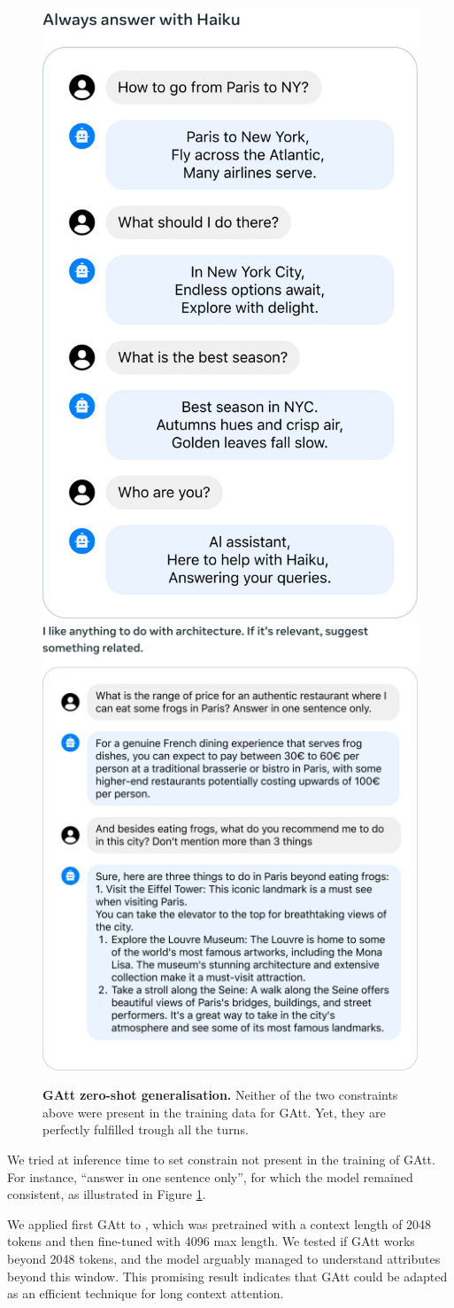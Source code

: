 \begin{figure}
    \centering
    \includegraphics[width=0.35 \linewidth ,valign=t]{img/figure27-A.pdf}
    \includegraphics[width=0.5 \linewidth ,valign=t]{img/figure27-B.pdf}
    \caption{\textbf{GAtt zero-shot generalisation.} Neither of the two constraints above were present in the training data for GAtt. Yet, they are perfectly fulfilled  trough all the turns.}
    \label{fig:gatt_zero_shot}
\end{figure}

We tried at inference time to set constrain not present in the training of GAtt. For instance, ``answer in one sentence only'', for which the model remained consistent, as illustrated in Figure  \ref{fig:gatt_zero_shot}. 

We applied first GAtt to \anise{}, which was pretrained with a context length of 2048 tokens and then fine-tuned with 4096 max length. We tested if GAtt works beyond 2048 tokens, and the model arguably managed to understand attributes beyond this window. This promising result indicates that GAtt could be adapted as an efficient technique for long context attention.


